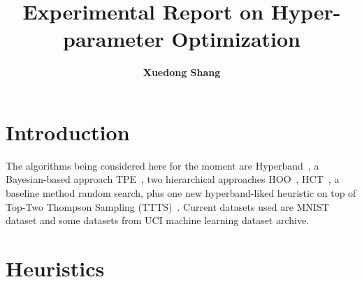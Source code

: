 \documentclass[runningheads,a4paper]{llncs}
\begin{document}
\mainmatter  %

\title{Experimental Report on Hyper-parameter Optimization}


%
%
\author{\textbf{Xuedong Shang}}
%


%
%

\toctitle{}
\maketitle


\begin{abstract}

\end{abstract}


\section{Introduction}

The algorithms being considered here for the moment are Hyperband~\cite{li2016}, a Bayesian-based approach TPE~\cite{bergstra2011}, two hierarchical approaches HOO~\cite{bubeck2011}, HCT~\cite{azar2014}, a baseline method random search, plus one new hyperband-liked heuristic on top of Top-Two Thompson Sampling (TTTS)~\cite{russo2016}. Current datasets used are MNIST dataset and some datasets from UCI machine learning dataset archive.

\section{Heuristics}
\end{document}
